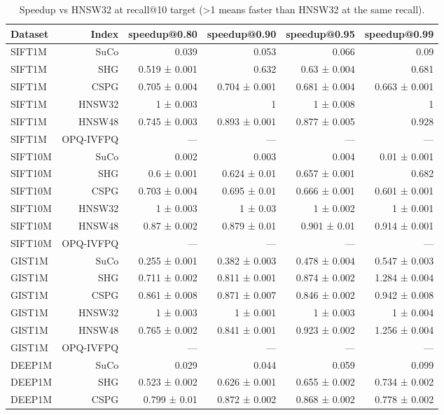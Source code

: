 \begin{table}[t]
\centering
\small
\caption{Speedup vs HNSW32 at recall@10 target (>1 means faster than HNSW32 at the same recall).}
\label{tab:speedup-k10}
\begin{tabular}{lrrrrr}
\toprule
Dataset & Index & speedup@0.80 & speedup@0.90 & speedup@0.95 & speedup@0.99 \\
\midrule
SIFT1M & SuCo & 0.039 & 0.053 & 0.066 & 0.09 \\
SIFT1M & SHG & 0.519 ± 0.001 & 0.632 & 0.63 ± 0.004 & 0.681 \\
SIFT1M & CSPG & 0.705 ± 0.004 & 0.704 ± 0.001 & 0.681 ± 0.004 & 0.663 ± 0.001 \\
SIFT1M & HNSW32 & 1 ± 0.003 & 1 & 1 ± 0.008 & 1 \\
SIFT1M & HNSW48 & 0.745 ± 0.003 & 0.893 ± 0.001 & 0.877 ± 0.005 & 0.928 \\
SIFT1M & OPQ-IVFPQ & — & — & — & — \\
SIFT10M & SuCo & 0.002 & 0.003 & 0.004 & 0.01 ± 0.001 \\
SIFT10M & SHG & 0.6 ± 0.001 & 0.624 ± 0.01 & 0.657 ± 0.001 & 0.682 \\
SIFT10M & CSPG & 0.703 ± 0.004 & 0.695 ± 0.01 & 0.666 ± 0.001 & 0.601 ± 0.001 \\
SIFT10M & HNSW32 & 1 ± 0.003 & 1 ± 0.03 & 1 ± 0.002 & 1 ± 0.001 \\
SIFT10M & HNSW48 & 0.87 ± 0.002 & 0.879 ± 0.01 & 0.901 ± 0.01 & 0.914 ± 0.001 \\
SIFT10M & OPQ-IVFPQ & — & — & — & — \\
GIST1M & SuCo & 0.255 ± 0.001 & 0.382 ± 0.003 & 0.478 ± 0.004 & 0.547 ± 0.003 \\
GIST1M & SHG & 0.711 ± 0.002 & 0.811 ± 0.001 & 0.874 ± 0.002 & 1.284 ± 0.004 \\
GIST1M & CSPG & 0.861 ± 0.008 & 0.871 ± 0.007 & 0.846 ± 0.002 & 0.942 ± 0.008 \\
GIST1M & HNSW32 & 1 ± 0.003 & 1 ± 0.001 & 1 ± 0.003 & 1 ± 0.004 \\
GIST1M & HNSW48 & 0.765 ± 0.002 & 0.841 ± 0.001 & 0.923 ± 0.002 & 1.256 ± 0.004 \\
GIST1M & OPQ-IVFPQ & — & — & — & — \\
DEEP1M & SuCo & 0.029 & 0.044 & 0.059 & 0.099 \\
DEEP1M & SHG & 0.523 ± 0.002 & 0.626 ± 0.001 & 0.655 ± 0.002 & 0.734 ± 0.002 \\
DEEP1M & CSPG & 0.799 ± 0.01 & 0.872 ± 0.002 & 0.868 ± 0.002 & 0.778 ± 0.002 \\

\end{tabular}
\end{table}

